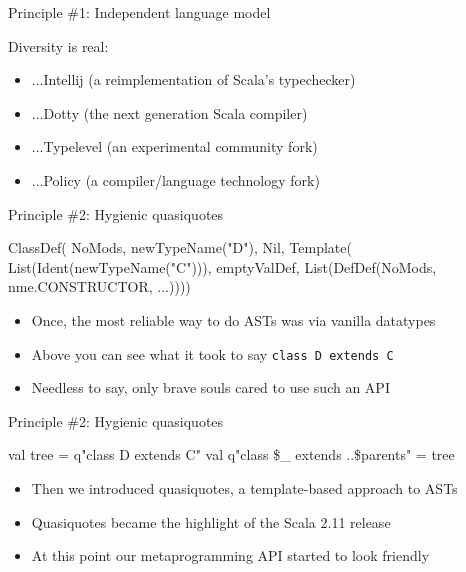 \documentclass[svgnames,dvipsnames,hyperref={bookmarks=false},usepdftitle=false]{beamer}
\begin{document}
\begin{frame}{Principle \#1: Independent language model}

Diversity is real:
\begin{itemize}
\item ...Intellij (a reimplementation of Scala's typechecker)
\item ...Dotty (the next generation Scala compiler)
\item ...Typelevel (an experimental community fork)
\item ...Policy (a compiler/language technology fork)
\end{itemize}

\end{frame}

\begin{frame}[fragile]{Principle \#2: Hygienic quasiquotes}
\begin{semiverbatim}
ClassDef(
  NoMods,
  newTypeName("D"),
  Nil,
  Template(
    List(Ident(newTypeName("C"))),
    emptyValDef,
    List(DefDef(NoMods, nme.CONSTRUCTOR, ...))))

\end{semiverbatim}

\begin{itemize}
\item Once, the most reliable way to do ASTs was via vanilla datatypes
\item Above you can see what it took to say \texttt{class D extends C}
\item Needless to say, only brave souls cared to use such an API
\end{itemize}
\end{frame}

\begin{frame}[fragile]{Principle \#2: Hygienic quasiquotes}
\begin{semiverbatim}
val tree = q"class D extends C"
val q"class \$_ extends ..\$parents" = tree

\end{semiverbatim}

\begin{itemize}
\item Then we introduced quasiquotes, a template-based approach to ASTs
\item Quasiquotes became the highlight of the Scala 2.11 release
\item At this point our metaprogramming API started to look friendly
\end{itemize}
\end{frame}
\end{document}
